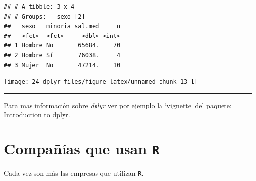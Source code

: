 \documentclass[]{book}
\newenvironment{Shaded}{\begin{snugshade}}{\end{snugshade}}
\newcommand{\KeywordTok}[1]{\textcolor[rgb]{0.13,0.29,0.53}{\textbf{#1}}}
\newcommand{\DataTypeTok}[1]{\textcolor[rgb]{0.13,0.29,0.53}{#1}}
\newcommand{\DecValTok}[1]{\textcolor[rgb]{0.00,0.00,0.81}{#1}}
\newcommand{\StringTok}[1]{\textcolor[rgb]{0.31,0.60,0.02}{#1}}
\newcommand{\OperatorTok}[1]{\textcolor[rgb]{0.81,0.36,0.00}{\textbf{#1}}}
\newcommand{\NormalTok}[1]{#1}
\begin{document}
\begin{verbatim}
## # A tibble: 3 x 4
## # Groups:   sexo [2]
##   sexo   minoria sal.med     n
##   <fct>  <fct>     <dbl> <int>
## 1 Hombre No       65684.    70
## 2 Hombre Sí       76038.     4
## 3 Mujer  No       47214.    10
\end{verbatim}

\begin{Shaded}
\end{Shaded}

\begin{center}\texttt{[image: 24-dplyr\_files/figure-latex/unnamed-chunk-13-1]} \end{center}

\begin{center}\rule{0.5\linewidth}{\linethickness}\end{center}

Para mas información sobre \emph{dplyr} ver por ejemplo la `vignette'
del paquete:\\
\href{http://cran.rstudio.com/web/packages/dplyr/vignettes/introduction.html}{Introduction
to dplyr}.

\chapter{\texorpdfstring{Compañías que usan
\texttt{R}}{Compañías que usan R}}\label{companias-que-usan-r}

Cada vez son más las empresas que utilizan \texttt{R}.
\end{document}

